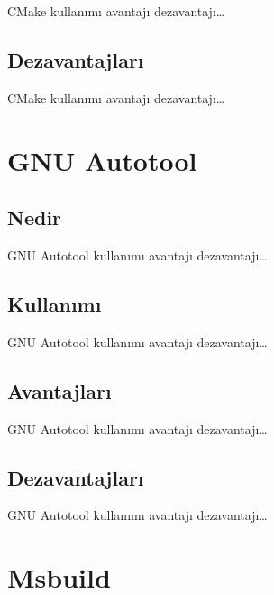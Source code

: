 \documentclass[
]{book}
\begin{document}
CMake kullanımı avantajı dezavantajı\ldots{}

\hypertarget{dezavantajlarux131-1}{%
\section*{Dezavantajları}\label{dezavantajlarux131-1}}

CMake kullanımı avantajı dezavantajı\ldots{}

\hypertarget{gnu-autotool}{%
\chapter*{GNU Autotool}\label{gnu-autotool}}

\hypertarget{nedir-2}{%
\section*{Nedir}\label{nedir-2}}

GNU Autotool kullanımı avantajı dezavantajı\ldots{}

\hypertarget{kullanux131mux131-2}{%
\section*{Kullanımı}\label{kullanux131mux131-2}}

GNU Autotool kullanımı avantajı dezavantajı\ldots{}

\hypertarget{avantajlarux131-2}{%
\section*{Avantajları}\label{avantajlarux131-2}}

GNU Autotool kullanımı avantajı dezavantajı\ldots{}

\hypertarget{dezavantajlarux131-2}{%
\section*{Dezavantajları}\label{dezavantajlarux131-2}}

GNU Autotool kullanımı avantajı dezavantajı\ldots{}

\hypertarget{msbuild}{%
\chapter*{Msbuild}\label{msbuild}}
\end{document}
